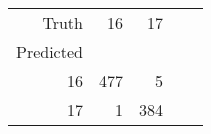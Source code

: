 \begin{table}[h]
\centering
\label{table:5}
\begin{tabular}{rrrrr}
\toprule
Truth & 16 & 17 \\
Predicted &  &  \\
\midrule
16 & 477 & 5 \\
17 & 1 & 384 \\
\bottomrule
\end{tabular}
\end{table}
